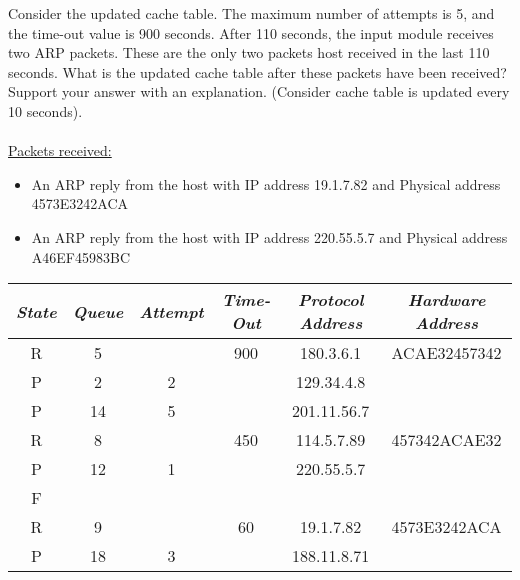 \documentclass[12pt]{article}
\newenvironment{exercise}[2][Exercise]{\begin{trivlist}
\item[\hskip \labelsep {\bfseries #1}\hskip \labelsep {\bfseries #2.}]}{\end{trivlist}}
\begin{document}
\begin{exercise}{5}
Consider the updated cache table. The maximum number of attempts is 5, and the time-out
value is 900 seconds. After 110 seconds, the input module receives two ARP packets.
These are the only two packets host received in the last 110 seconds. What is the updated
cache table after these packets have been received? Support your answer with an
explanation. (Consider cache table is updated every 10 seconds). \\ \\ 
\underline{Packets received:} 
\begin{itemize}
    \item An ARP reply from the host with IP address 19.1.7.82 and Physical address
4573E3242ACA 
\item An ARP reply from the host with IP address 220.55.5.7 and Physical address
A46EF45983BC
\end{itemize}

\begin{center}
\begin{tabular}{|c|c|c|c|c|c|}
    \hline
   \textit{State} & \textit{Queue} & \textit{Attempt} & \textit{Time-Out} & \textit{Protocol Address} & \textit{Hardware Address} \\
   \hline 
    R & 5 & & 900 & 180.3.6.1 & ACAE32457342 \\ 
    \hline 
    P & 2 & 2 & & 129.34.4.8 & \\ 
    \hline 
    P & 14 & 5 & & 201.11.56.7 & \\
    \hline 
    R & 8 & & 450 & 114.5.7.89 & 457342ACAE32 \\
    \hline
    P & 12 & 1 & & 220.55.5.7 & \\
    \hline
    F & & & & & \\
    \hline 
    R & 9 & & 60 & 19.1.7.82 & 4573E3242ACA \\
    \hline 
    P & 18 & 3 & & 188.11.8.71 & \\ 
    \hline 
\end{tabular}
\\
\end{center}
\end{exercise}
\end{document}
